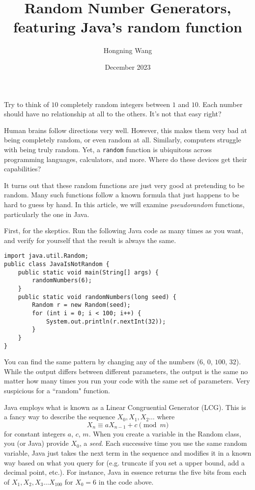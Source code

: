 \documentclass{article}
\title{Random Number Generators, featuring Java's random function}
\author{Hongning Wang}
\date{December 2023}
\begin{document}
\maketitle

Try to think of $10$ completely random integers between $1$ and $10$. Each number should have no relationship at all to the others. It's not that easy right? 

Human brains follow directions very well. However, this makes them very bad at being completely random, or even random at all. Similarly, computers struggle with being truly random. Yet, a \verb|random| function is ubiquitous across programming languages, calculators, and more. Where do these devices get their capabilities?

It turns out that these random functions are just very good at pretending to be random. Many such functions follow a known formula that just happens to be hard to guess by hand. In this article, we will examine \textit{pseudorandom} functions, particularly the one in Java.

First, for the skeptics. Run the following Java code as many times as you want, and verify for yourself that the result is always the same. 

\begin{verbatim}
import java.util.Random;
public class JavaIsNotRandom {
    public static void main(String[] args) {
        randomNumbers(6);
    }
    public static void randomNumbers(long seed) {
        Random r = new Random(seed);
        for (int i = 0; i < 100; i++) {
            System.out.println(r.nextInt(32));
        }
    }
}
\end{verbatim}
You can find the same pattern by changing any of the numbers ($6$, $0$, $100$, $32$). While the output differs between different parameters, the output is the same no matter how many times you run your code with the same set of parameters. Very suspicious for a ``random" function. 

Java employs what is known as a Linear Congruential Generator (LCG). This is a fancy way to describe the sequence $X_0, X_1, X_2 \dots$ where \[X_n \equiv aX_{n-1} + c \pmod{m}\] for constant integers $a$, $c$, $m$. When you create a variable in the Random class, you (or Java) provide $X_0$, a \textit{seed}. Each successive time you use the same random variable, Java just takes the next term in the sequence and modifies it in a known way based on what you query for (e.g. truncate if you set a upper bound, add a decimal point, etc.). For instance, Java in essence returns the five bits from each of $X_1, X_2, X_3 \dots X_{100}$ for $X_0 = 6$ in the code above. 
\end{document}
